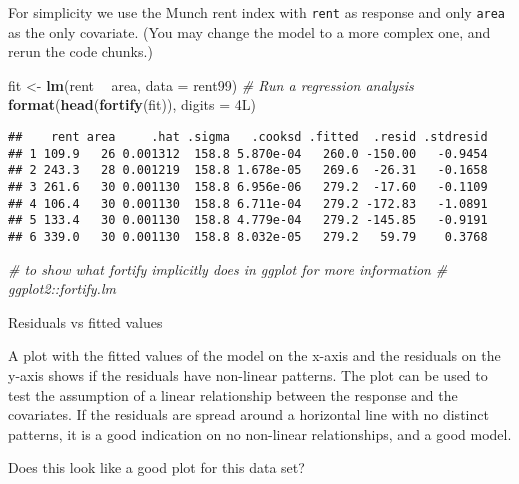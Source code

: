 \documentclass[ignorenonframetext,]{beamer}
\newenvironment{Shaded}{\begin{snugshade}}{\end{snugshade}}
\newcommand{\KeywordTok}[1]{\textcolor[rgb]{0.13,0.29,0.53}{\textbf{#1}}}
\newcommand{\DataTypeTok}[1]{\textcolor[rgb]{0.13,0.29,0.53}{#1}}
\newcommand{\StringTok}[1]{\textcolor[rgb]{0.31,0.60,0.02}{#1}}
\newcommand{\CommentTok}[1]{\textcolor[rgb]{0.56,0.35,0.01}{\textit{#1}}}
\newcommand{\OperatorTok}[1]{\textcolor[rgb]{0.81,0.36,0.00}{\textbf{#1}}}
\newcommand{\NormalTok}[1]{#1}
\begin{document}
\begin{frame}[fragile]

For simplicity we use the Munch rent index with \texttt{rent} as
response and only \texttt{area} as the only covariate. (You may change
the model to a more complex one, and rerun the code chunks.)

\footnotesize

\begin{Shaded}
\begin{Highlighting}[]
\NormalTok{fit <-}\StringTok{ }\KeywordTok{lm}\NormalTok{(rent }\OperatorTok{~}\StringTok{ }\NormalTok{area, }\DataTypeTok{data =}\NormalTok{ rent99)  }\CommentTok{# Run a regression analysis}
\KeywordTok{format}\NormalTok{(}\KeywordTok{head}\NormalTok{(}\KeywordTok{fortify}\NormalTok{(fit)), }\DataTypeTok{digits =}\NormalTok{ 4L)}
\end{Highlighting}
\end{Shaded}

\begin{verbatim}
##    rent area     .hat .sigma   .cooksd .fitted  .resid .stdresid
## 1 109.9   26 0.001312  158.8 5.870e-04   260.0 -150.00   -0.9454
## 2 243.3   28 0.001219  158.8 1.678e-05   269.6  -26.31   -0.1658
## 3 261.6   30 0.001130  158.8 6.956e-06   279.2  -17.60   -0.1109
## 4 106.4   30 0.001130  158.8 6.711e-04   279.2 -172.83   -1.0891
## 5 133.4   30 0.001130  158.8 4.779e-04   279.2 -145.85   -0.9191
## 6 339.0   30 0.001130  158.8 8.032e-05   279.2   59.79    0.3768
\end{verbatim}

\begin{Shaded}
\begin{Highlighting}[]
\CommentTok{# to show what fortify implicitly does in ggplot for more information}
\CommentTok{# ggplot2::fortify.lm}
\end{Highlighting}
\end{Shaded}

\normalsize

\end{frame}

\begin{frame}

\begin{block}{Residuals vs fitted values}

A plot with the fitted values of the model on the x-axis and the
residuals on the y-axis shows if the residuals have non-linear patterns.
The plot can be used to test the assumption of a linear relationship
between the response and the covariates. If the residuals are spread
around a horizontal line with no distinct patterns, it is a good
indication on no non-linear relationships, and a good model.

Does this look like a good plot for this data set?

\end{block}

\end{frame}
\end{document}
